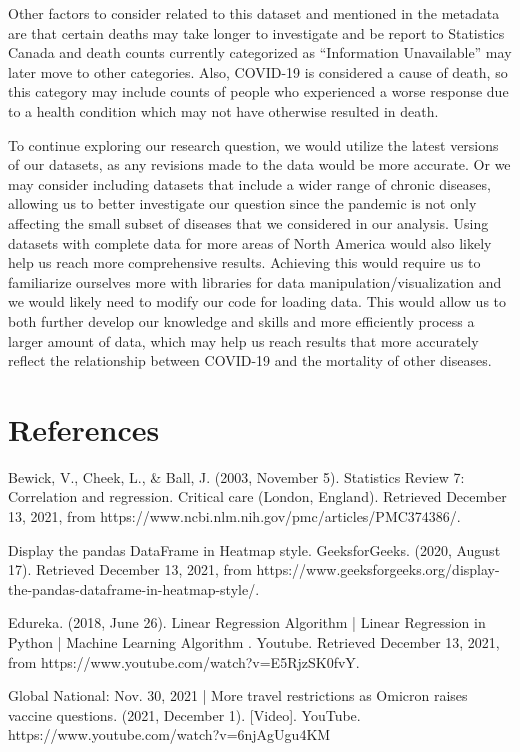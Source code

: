 \documentclass[fontsize=11pt]{article}
\begin{document}
\noindent
Other factors to consider related to this dataset and mentioned in the metadata are that certain deaths may take longer to investigate and be report to Statistics Canada and death counts currently categorized as “Information Unavailable” may later move to other categories. Also, COVID-19 is considered a cause of death, so this category may include counts of people who experienced a worse response due to a health condition which may not have otherwise resulted in death.

To continue exploring our research question, we would utilize the latest versions of our datasets, as any revisions made to the data would be more accurate. Or we may consider including datasets that include a wider range of chronic diseases, allowing us to better investigate our question since the pandemic is not only affecting the small subset of diseases that we considered in our analysis. Using datasets with complete data for more areas of North America would also likely help us reach more comprehensive results. Achieving this would require us to familiarize ourselves more with libraries for data manipulation/visualization and we would likely need to modify our code for loading data. This would allow us to both further develop our knowledge and skills and more efficiently process a larger amount of data, which may help us reach results that more accurately reflect the relationship between COVID-19 and the mortality of other diseases.


\section*{References}

Bewick, V., Cheek, L., \& Ball, J. (2003, November 5). Statistics Review 7: Correlation and regression. Critical care (London, England). Retrieved December 13, 2021, from https://www.ncbi.nlm.nih.gov/pmc/articles/PMC374386/. 


\noindent
Display the pandas DataFrame in Heatmap style. GeeksforGeeks. (2020, August 17). Retrieved December 13, 2021, from https://www.geeksforgeeks.org/display-the-pandas-dataframe-in-heatmap-style/. 


\noindent
Edureka. (2018, June 26). Linear Regression Algorithm | Linear Regression in Python | Machine Learning Algorithm . Youtube. Retrieved December 13, 2021, from https://www.youtube.com/watch?v=E5RjzSK0fvY. 


\noindent
Global National: Nov. 30, 2021 | More travel restrictions as Omicron raises vaccine questions. (2021, December 1). [Video]. YouTube. https://www.youtube.com/watch?v=6njAgUgu4KM
\end{document}
